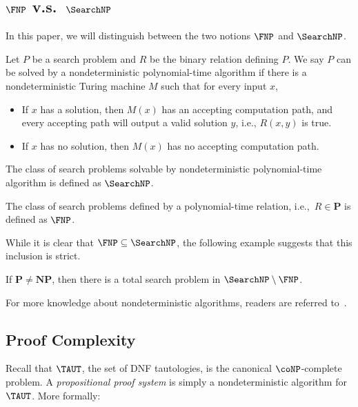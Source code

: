 \subsection{\texorpdfstring{$\FNP$}{FNP} v.s.~\texorpdfstring{$\SearchNP$}{SearchNP}}
In this paper, we will distinguish between the two notions $\FNP$ and $\SearchNP$.

\begin{definition}
    Let $P$ be a search problem and $R$ be the binary relation defining $P$. We say $P$ can be solved by a nondeterministic polynomial-time algorithm if there is a nondeterministic Turing machine $M$ such that for every input $x$,
    \begin{itemize}
        \item If $x$ has a solution, then $M(x)$ has an accepting computation path, and every accepting path will output a valid solution $y$, i.e., $R(x,y)$ is true.
        \item If $x$ has no solution, then $M(x)$ has no accepting computation path.
    \end{itemize}
    The class of search problems solvable by nondeterministic polynomial-time algorithm is defined as $\SearchNP$.
\end{definition}

\begin{definition}
    The class of search problems defined by a polynomial-time relation, i.e.,~$R\in \mathbf{P}$ is defined as $\FNP$.
\end{definition}

While it is clear that $\FNP\subseteq \SearchNP$, the following example suggests that this inclusion is strict.

\begin{proposition}
    If $\mathbf{P}\neq \mathbf{NP}$, then there is a total search problem in $\SearchNP\setminus \FNP$.
\end{proposition}

For more knowledge about nondeterministic algorithms, readers are referred to~\cite[Section 2.4]{DBLP:conf/stoc/ChenL24}.

\subsection{Proof Complexity}\label{sec: proof complexity}

Recall that $\TAUT$, the set of DNF tautologies, is the canonical $\coNP$-complete problem. A \emph{propositional proof system} is simply a nondeterministic algorithm for $\TAUT$. More formally:

